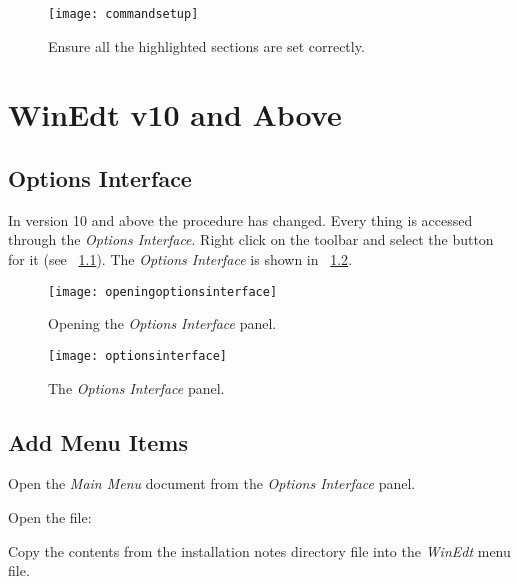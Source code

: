 \documentclass{lebook}
\begin{document}
    \begin{figure}
        \centering
        \texttt{[image: commandsetup]}
        \caption{Ensure all the highlighted sections are set correctly.}
        \label{fig:commandsetup}
    \end{figure}


    \chapter{WinEdt v10 and Above}
    \section{Options Interface}
In version 10 and above the procedure has changed.  Every thing is accessed through the \textit{Options Interface}.  Right click on the toolbar and select the button for it (see \figurename~\ref{fig:openingoptionsinterface}).  The \textit{Options Interface} is shown in \figurename~\ref{fig:optionsinterface}.
    \begin{figure}
		\centering
		\texttt{[image: openingoptionsinterface]}
		\caption{Opening the \textit{Options Interface} panel.}
		\label{fig:openingoptionsinterface}
    \end{figure}

    \begin{figure}
		\centering
		\texttt{[image: optionsinterface]}
		\caption{The \textit{Options Interface} panel.}
		\label{fig:optionsinterface}
    \end{figure}


	\section{Add Menu Items}

	\begin{numberedlist}
		\item Open the \textit{Main Menu} document from the \textit{Options Interface} panel.
        \item Open the file: 
        \item Copy the contents from the installation notes directory file into the \textit{WinEdt} menu file.
	\end{numberedlist}
\end{document}
